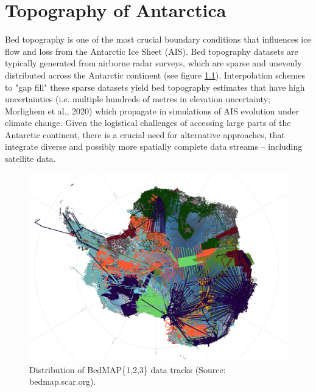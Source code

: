 \chapter{Topography of Antarctica}\label{review}




Bed topography is one of the most crucial boundary conditions that influences ice flow and loss from the Antarctic Ice Sheet (AIS)\cite{Morlighem_2020}. Bed topography datasets are typically generated from airborne radar surveys, which are sparse and unevenly distributed across the Antarctic continent (see figure \ref{fig:BedMAP}). Interpolation schemes to "gap fill" these sparse datasets yield bed topography estimates that have high uncertainties (i.e. multiple hundreds of metres in elevation uncertainty; Morlighem et al., 2020) which propagate in simulations of AIS evolution under climate change\cite{Castleman_2022}. Given the logistical challenges of accessing large parts of the Antarctic continent, there is a crucial need for alternative approaches, that integrate diverse and possibly more spatially complete data streams – including satellite data.
\begin{figure}[H] %
    \includegraphics[scale=0.4]{bedmap.png}
    \caption{Distribution of BedMAP\{1,2,3\} data tracks (Source: bedmap.scar.org).}
    \label{fig:BedMAP}
\end{figure}

